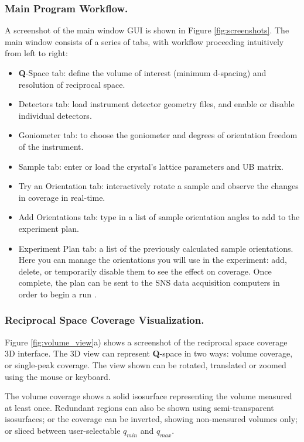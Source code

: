 \documentclass[final]{iucr}              %
\begin{document}
\subsubsection{Main Program Workflow.}
A screenshot of the main window GUI is shown in Figure \ref{fig:screenshots}.
The main window consists of a series of tabs, with workflow proceeding
intuitively from left to right:

\begin{itemize}
  	\item {\bf Q}-Space tab: define the volume of interest (minimum d-spacing)
  	and resolution of reciprocal space. 
 	\item Detectors tab: load instrument detector geometry
files, and enable or disable individual detectors. 
	\item Goniometer tab: to choose the
goniometer and degrees of orientation freedom of the instrument.
  	\item Sample tab: enter or load the crystal's lattice parameters and UB
  matrix.
  	\item Try an Orientation tab: interactively rotate a sample and observe the
  changes in coverage in real-time.
  	\item Add Orientations tab: type in a list of sample orientation angles to
  add to the experiment plan.
 
  	\item Experiment Plan tab: a list of the previously calculated sample
orientations. Here you can manage the orientations you will use in the experiment: add,
delete, or temporarily disable them to see the effect on coverage. Once
complete, the plan can be sent to the SNS data acquisition computers in order to
begin a run \cite{SNSDAS}.
    
\end{itemize} 



\subsubsection{Reciprocal Space Coverage Visualization.}
Figure \ref{fig:volume_view}a) shows a screenshot of the reciprocal space
coverage 3D interface. The 3D view can represent {\bf Q}-space in two ways: volume coverage, or single-peak
coverage. The view shown can be rotated, translated or zoomed using the mouse or
keyboard.

The volume coverage shows a solid isosurface representing the volume measured at
least once. Redundant regions can also be shown using semi-transparent
isosurfaces; or the coverage can be inverted, showing non-measured volumes only;
or sliced between user-selectable $q_{min}$ and $q_{max}$.        
\end{document}
